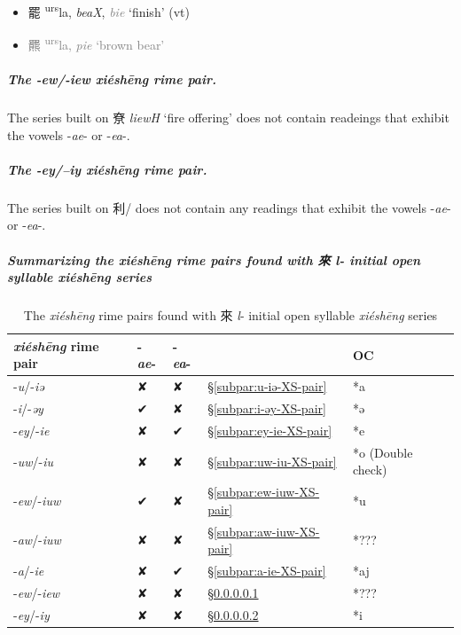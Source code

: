 \begin{itemize}
   \item {\Large{罷}} %
    {\large{{\textsuperscript{urs}}la}},
    \textit{beaX}, {\textcolor{gray}{ \textit{bie}}} `finish' (vt) %

  \item {\textcolor{gray}{{\Large{羆}} %
    {\large{{\textsuperscript{urs}}la}},
    \textit{pie} `brown bear'}} %


\end{itemize}





\subparagraph{The -\textit{ew}/-\textit{iew} \textit{xiéshēng} rime pair.}
\label{subpar:ew-iew-XS-pair}
The series built on 尞 \textit{liewH}   `fire offering' does not contain readeings that exhibit the vowels -\textit{ae}- or -\textit{ea}-. 

\subparagraph{The -\textit{ey}/--\textit{iy} \textit{xiéshēng} rime pair.}
\label{subpar:ey-iy-XS-pair}
The series built on 利/{} does not contain any readings that exhibit the vowels -\textit{ae}- or -\textit{ea}-. 












\subparagraph{Summarizing the \textit{xiéshēng} rime pairs found with  來 \textit{l}- initial open syllable \textit{xiéshēng} series}

\begin{table}[htbp]
    \centering
    \begin{tabular}{|l|l|l|l|l|}
    \hline
    \textit{xiéshēng} rime pair  & -\textit{ae}- & -\textit{ea}- & &  OC \\ \hline
-\textit{u}/-\textit{iə} & ✘ & ✘ & §\ref{subpar:u-iə-XS-pair} & *a  \\\hline
-\textit{i}/-\textit{əy} & ✔ & ✘ & §\ref{subpar:i-əy-XS-pair} & *ə   \\ \hline
 -\textit{ey}/-\textit{ie} & ✘ & ✔ & §\ref{subpar:ey-ie-XS-pair} & *e \\ \hline
 -\textit{uw}/-\textit{iu} & ✘ & ✘ & §\ref{subpar:uw-iu-XS-pair} & *o (Double check) \\ \hline
 -\textit{ew}/-\textit{iuw} & ✔ & ✘ & §\ref{subpar:ew-iuw-XS-pair} & *u \\ \hline
 -\textit{aw}/-\textit{iuw} 
 & ✘ & ✘ & §\ref{subpar:aw-iuw-XS-pair} & *??? \\ \hline
 -\textit{a}/-\textit{ie} & ✘ & ✔ & §\ref{subpar:a-ie-XS-pair} & *aj \\ \hline
 -\textit{ew}/-\textit{iew} & ✘ & ✘ & §\ref{subpar:ew-iew-XS-pair} & *??? \\ \hline
 -\textit{ey}/-\textit{iy} & ✘ & ✘ & §\ref{subpar:ey-iy-XS-pair} & *i \\ \hline
    \end{tabular}
    \caption{The \textit{xiéshēng} rime pairs found with  來 \textit{l}- initial open syllable \textit{xiéshēng} series}
    \label{tab:div2-in-l-XS-rime-pairs}
\end{table}

